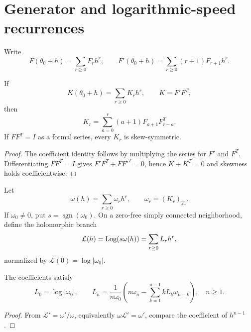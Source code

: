 \section{Generator and logarithmic-speed recurrences}
Write
\begin{equation}
F(\theta_0+h)=\sum_{r\ge0}F_rh^r,
\qquad
F'(\theta_0+h)=\sum_{r\ge0}(r+1)F_{r+1}h^r.
\end{equation}

\begin{theorem}
\label{thm:generatorrecurrence}
If
\[
K(\theta_0+h)=\sum_{r\ge0}K_rh^r,
\qquad K=F'F^T,
\]
then
\begin{equation}
K_r=\sum_{a=0}^{r}(a+1)F_{a+1}F_{r-a}^{T}.
\label{eq:Krecurrence}
\end{equation}
If $FF^T=I$ as a formal series, every $K_r$ is skew-symmetric.
\end{theorem}

\begin{proof}
The coefficient identity follows by multiplying the series for $F'$ and $F^T$.  Differentiating $FF^T=I$ gives $F'F^T+FF'^T=0$, hence $K+K^T=0$ and skewness holds coefficientwise.
\end{proof}

Let
\begin{equation}
\omega(h)=\sum_{r\ge0}\omega_rh^r,
\qquad
\omega_r=(K_r)_{21}.
\label{eq:omegajet}
\end{equation}
If $\omega_0\ne0$, put $s=\operatorname{sgn}(\omega_0)$.  On a zero-free simply connected neighborhood, define the holomorphic branch
\begin{equation}
\mathcal L(h)=\operatorname{Log}(s\omega(h))=\sum_{r\ge0}L_rh^r,
\label{eq:logjet}
\end{equation}
normalized by $\mathcal L(0)=\log|\omega_0|$.

\begin{lemma}
\label{lem:logrecurrence}
The coefficients satisfy
\begin{equation}
L_0=\log|\omega_0|,
\qquad
L_n=\frac{1}{n\omega_0}
\left(n\omega_n-\sum_{k=1}^{n-1}kL_k\omega_{n-k}\right),
\quad n\ge1.
\label{eq:logrecurrence}
\end{equation}
\end{lemma}

\begin{proof}
From $\mathcal L'=\omega'/\omega$, equivalently $\omega\mathcal L'=\omega'$, compare the coefficient of $h^{n-1}$.
\end{proof}

